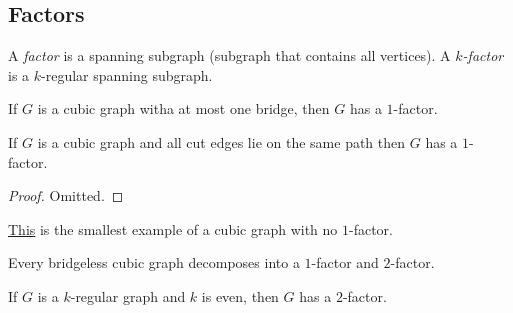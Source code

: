 
\subsection{Factors}


\begin{definition}
    A \emph{factor} is a spanning subgraph (subgraph that contains all vertices).
    A \emph{$k$-factor} is a $k$-regular spanning subgraph.
\end{definition}

\begin{theorem}[Petersen]
    If $G$ is a cubic graph witha at most one bridge, then 
    $G$ has a $1$-factor.    
\end{theorem}


\begin{theorem}[Petersen]
    If $G$ is a cubic graph and all cut edges lie on the 
    same path then $G$ has a $1$-factor.
\end{theorem}

\begin{proof}
    Omitted.
\end{proof}

\begin{example}
    \href{https://mathworld.wolfram.com/PetersensTheorem.html}{This} 
    is the smallest example of a cubic graph with no $1$-factor.
\end{example}

\begin{theorem}[Petersen]
    Every bridgeless cubic graph decomposes into a $1$-factor 
    and $2$-factor.
\end{theorem}

\begin{theorem}
    If $G$ is a $k$-regular graph and $k$ is even, then $G$ has 
    a $2$-factor.
\end{theorem}